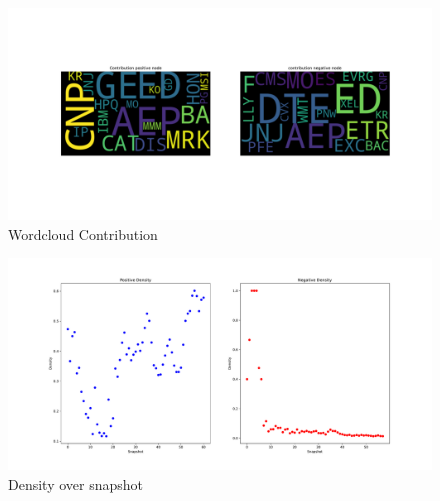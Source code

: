 \documentclass[sigchi]{acmart}
\begin{document}
\begin{figure}[H]
	\centering
	\includegraphics[width=\linewidth]{plot/wordcloud_contribution.pdf}
	\caption{Wordcloud Contribution}
\end{figure}
\begin{figure}[H]
	\centering
	\includegraphics[width=\linewidth]{plot/density_dynamic.pdf}
	\caption{Density over snapshot}
\end{figure}
\end{document}
